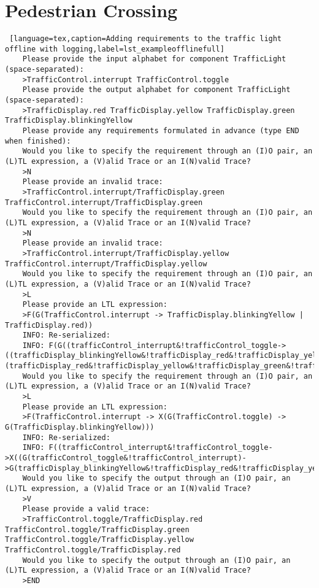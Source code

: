 \clearpage\section{Pedestrian Crossing}
\bigskip
\begin{lstlisting} [language=tex,caption=Adding requirements to the traffic light offline with logging,label=lst_exampleofflinefull]
	Please provide the input alphabet for component TrafficLight (space-separated):
	>TrafficControl.interrupt TrafficControl.toggle
	Please provide the output alphabet for component TrafficLight (space-separated):
	>TrafficDisplay.red TrafficDisplay.yellow TrafficDisplay.green TrafficDisplay.blinkingYellow
	Please provide any requirements formulated in advance (type END when finished):
	Would you like to specify the requirement through an (I)O pair, an (L)TL expression, a (V)alid Trace or an I(N)valid Trace?
	>N
	Please provide an invalid trace:
	>TrafficControl.interrupt/TrafficDisplay.green TrafficControl.interrupt/TrafficDisplay.green
	Would you like to specify the requirement through an (I)O pair, an (L)TL expression, a (V)alid Trace or an I(N)valid Trace?
	>N
	Please provide an invalid trace:
	>TrafficControl.interrupt/TrafficDisplay.yellow TrafficControl.interrupt/TrafficDisplay.yellow
	Would you like to specify the requirement through an (I)O pair, an (L)TL expression, a (V)alid Trace or an I(N)valid Trace?
	>L
	Please provide an LTL expression:
	>F(G(TrafficControl.interrupt -> TrafficDisplay.blinkingYellow | TrafficDisplay.red))
	INFO: Re-serialized:
	INFO: F(G((trafficControl_interrupt&!trafficControl_toggle->((trafficDisplay_blinkingYellow&!trafficDisplay_red&!trafficDisplay_yellow&!trafficDisplay_green)|(trafficDisplay_red&!trafficDisplay_yellow&!trafficDisplay_green&!trafficDisplay_blinkingYellow)))))
	Would you like to specify the requirement through an (I)O pair, an (L)TL expression, a (V)alid Trace or an I(N)valid Trace?
	>L
	Please provide an LTL expression:
	>F(TrafficControl.interrupt -> X(G(TrafficControl.toggle) -> G(TrafficDisplay.blinkingYellow)))
	INFO: Re-serialized:
	INFO: F((trafficControl_interrupt&!trafficControl_toggle->X((G(trafficControl_toggle&!trafficControl_interrupt)->G(trafficDisplay_blinkingYellow&!trafficDisplay_red&!trafficDisplay_yellow&!trafficDisplay_green)))))
	Would you like to specify the output through an (I)O pair, an (L)TL expression, a (V)alid Trace or an I(N)valid Trace?
	>V
	Please provide a valid trace:
	>TrafficControl.toggle/TrafficDisplay.red TrafficControl.toggle/TrafficDisplay.green TrafficControl.toggle/TrafficDisplay.yellow TrafficControl.toggle/TrafficDisplay.red
	Would you like to specify the output through an (I)O pair, an (L)TL expression, a (V)alid Trace or an I(N)valid Trace?
	>END
\end{lstlisting}
